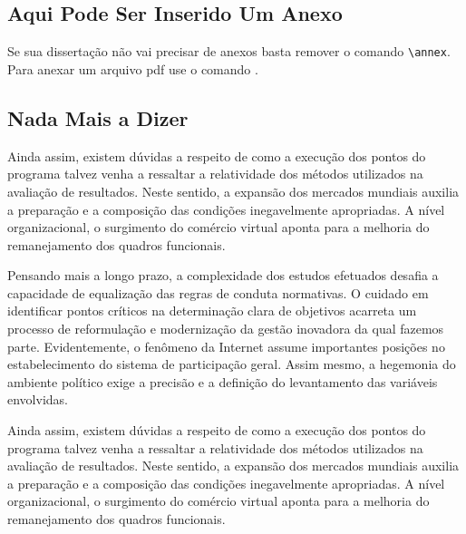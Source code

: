 \documentclass[fleqn]{icat-ufal}
\begin{document}
\annex

\begin{spacing}{1.5}
\chapter{Aqui Pode Ser Inserido Um Anexo}
\end{spacing}
\label{cap:um_anexo}

Se sua dissertação não vai precisar de anexos basta remover o comando 
\lstinline|\annex|.
Para anexar um arquivo pdf use o comando
\lstinline||.

\section{Nada Mais a Dizer}

Ainda assim, existem dúvidas a respeito de como a execução dos pontos do
programa talvez venha a ressaltar a relatividade dos métodos utilizados na
avaliação de resultados. Neste sentido, a expansão dos mercados mundiais auxilia
a preparação e a composição das condições inegavelmente apropriadas. A nível
organizacional, o surgimento do comércio virtual aponta para a melhoria do
remanejamento dos quadros funcionais. 

Pensando mais a longo prazo, a complexidade dos estudos efetuados desafia a
capacidade de equalização das regras de conduta normativas. O cuidado em
identificar pontos críticos na determinação clara de objetivos acarreta um
processo de reformulação e modernização da gestão inovadora da qual fazemos
parte. Evidentemente, o fenômeno da Internet assume importantes posições no
estabelecimento do sistema de participação geral. Assim mesmo, a hegemonia do
ambiente político exige a precisão e a definição do levantamento das variáveis
envolvidas. 

Ainda assim, existem dúvidas a respeito de como a execução dos pontos do
programa talvez venha a ressaltar a relatividade dos métodos utilizados na
avaliação de resultados. Neste sentido, a expansão dos mercados mundiais auxilia
a preparação e a composição das condições inegavelmente apropriadas. A nível
organizacional, o surgimento do comércio virtual aponta para a melhoria do
remanejamento dos quadros funcionais. 
\end{document}
